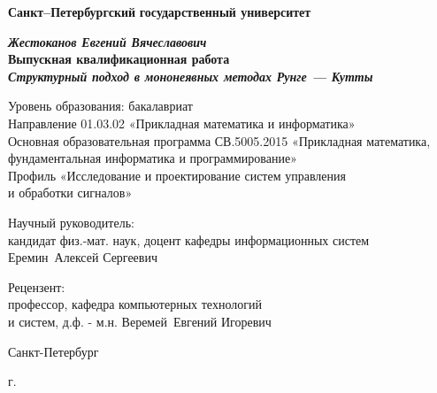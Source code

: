 
\begin{titlepage}
\begin{center}

\textbf{Санкт--Петербургский}
\textbf{государственный университет}

\vspace{35mm}

\textbf{\textit{\large Жестоканов Евгений Вячеславович}} \\[8mm]
\textbf{\large Выпускная квалификационная работа}\\[3mm]
\textbf{\textit{\large Структурный подход в мононеявных методах Рунге — Кутты}}

\vspace{20mm}
Уровень образования: бакалавриат\\
Направление 01.03.02 «Прикладная математика и информатика»\\
Основная образовательная программа СВ.5005.2015
«Прикладная математика, фундаментальная информатика и программирование»\\
Профиль «Исследование и проектирование систем управления\\ и обработки сигналов»\\[25mm]


\begin{flushright}
\begin{minipage}[t]{0.65\textwidth}
{Научный руководитель:} \\
кандидат физ.-мат. наук, доцент кафедры информационных систем Еремин~Алексей Сергеевич 

\vspace{10mm}

{Рецензент:} \\
профессор, кафедра компьютерных технологий \\и систем, д.ф. - м.н. Веремей~Евгений Игоревич
\end{minipage}
\end{flushright}

\vfill 

{Санкт-Петербург}
\par{\the\year{} г.}
\end{center}
\end{titlepage}
\restoregeometry
\addtocounter{page}{1}
